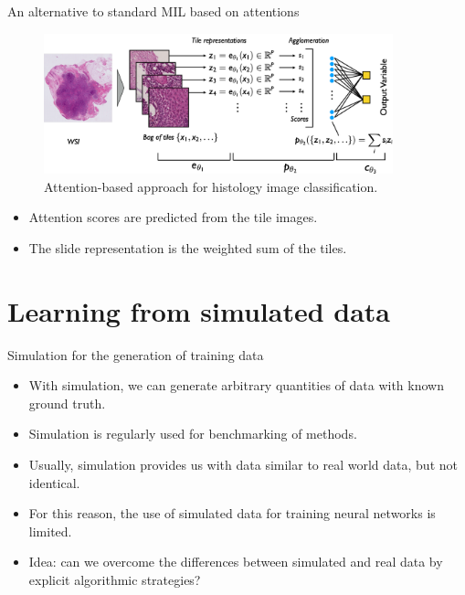 \documentclass[xcolor=pdftex,dvipsnames,table]{beamer}
\begin{document}
\begin{frame}{An alternative to standard MIL based on attentions}
\begin{figure}[htb]
   \centering
   \includegraphics[width=0.9\textwidth]{../graphics/histo_ex3.pdf}
   \caption{Attention-based approach for histology image classification.}
\end{figure}
\begin{itemize}
\item Attention scores are predicted from the tile images.
\item The slide representation is the weighted sum of the tiles. 
\end{itemize}
\end{frame}


\section{Learning from simulated data}

\begin{frame}{Simulation for the generation of training data}
\begin{itemize}
\item With simulation, we can generate arbitrary quantities of data with known ground truth. 
\item Simulation is regularly used for benchmarking of methods.
\item Usually, simulation provides us with data similar to real world data, but not identical. 
\item For this reason, the use of simulated data for training neural networks is limited. 
\item Idea: can we overcome the differences between simulated and real data by explicit algorithmic strategies? 
\end{itemize}
\end{frame}
\end{document}
